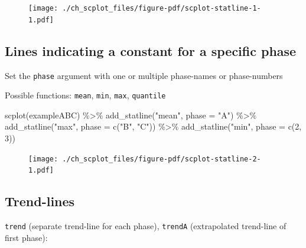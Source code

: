 \documentclass[
  letterpaper,
  DIV=11,
  numbers=noendperiod]{scrreprt}
\newenvironment{Shaded}{\begin{snugshade}}{\end{snugshade}}
\newcommand{\AttributeTok}[1]{\textcolor[rgb]{0.40,0.45,0.13}{#1}}
\newcommand{\DecValTok}[1]{\textcolor[rgb]{0.68,0.00,0.00}{#1}}
\newcommand{\FunctionTok}[1]{\textcolor[rgb]{0.28,0.35,0.67}{#1}}
\newcommand{\NormalTok}[1]{\textcolor[rgb]{0.00,0.23,0.31}{#1}}
\newcommand{\SpecialCharTok}[1]{\textcolor[rgb]{0.37,0.37,0.37}{#1}}
\newcommand{\StringTok}[1]{\textcolor[rgb]{0.13,0.47,0.30}{#1}}
\begin{document}
\begin{figure}[H]

{\centering \texttt{[image: ./ch\_scplot\_files/figure-pdf/scplot-statline-1-1.pdf]}

}

\end{figure}

\hypertarget{lines-indicating-a-constant-for-a-specific-phase}{%
\subsection{Lines indicating a constant for a specific
phase}\label{lines-indicating-a-constant-for-a-specific-phase}}

Set the \texttt{phase} argument with one or multiple phase-names or
phase-numbers

Possible functions: \texttt{mean}, \texttt{min}, \texttt{max},
\texttt{quantile}

\begin{Shaded}
\begin{Highlighting}[]
\FunctionTok{scplot}\NormalTok{(exampleABC) }\SpecialCharTok{\%\textgreater{}\%}
  \FunctionTok{add\_statline}\NormalTok{(}\StringTok{"mean"}\NormalTok{, }\AttributeTok{phase =} \StringTok{"A"}\NormalTok{) }\SpecialCharTok{\%\textgreater{}\%}
  \FunctionTok{add\_statline}\NormalTok{(}\StringTok{"max"}\NormalTok{, }\AttributeTok{phase =} \FunctionTok{c}\NormalTok{(}\StringTok{"B"}\NormalTok{, }\StringTok{"C"}\NormalTok{)) }\SpecialCharTok{\%\textgreater{}\%}
  \FunctionTok{add\_statline}\NormalTok{(}\StringTok{"min"}\NormalTok{, }\AttributeTok{phase =} \FunctionTok{c}\NormalTok{(}\DecValTok{2}\NormalTok{, }\DecValTok{3}\NormalTok{))}
\end{Highlighting}
\end{Shaded}

\begin{figure}[H]

{\centering \texttt{[image: ./ch\_scplot\_files/figure-pdf/scplot-statline-2-1.pdf]}

}

\end{figure}

\hypertarget{trend-lines}{%
\subsection{Trend-lines}\label{trend-lines}}

\texttt{trend} (separate trend-line for each phase), \texttt{trendA}
(extrapolated trend-line of first phase):
\end{document}
